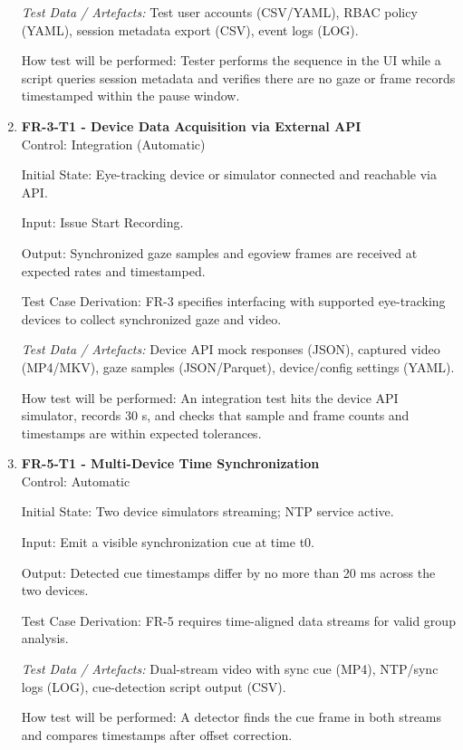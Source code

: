 \documentclass[12pt, titlepage]{article}
\begin{document}
\begin{enumerate}
\textit{Test Data / Artefacts:} Test user accounts (CSV/YAML), RBAC policy (YAML), session metadata export (CSV), event logs (LOG).

How test will be performed: Tester performs the sequence in the UI while a script queries session metadata and verifies there are no gaze or frame records timestamped within the pause window.

\item \textbf{FR-3-T1 - Device Data Acquisition via External API} \\

Control: Integration (Automatic)

Initial State: Eye-tracking device or simulator connected and reachable via API.

Input: Issue Start Recording.

Output: Synchronized gaze samples and egoview frames are received at expected rates and timestamped.

Test Case Derivation: FR-3 specifies interfacing with supported eye-tracking devices to collect synchronized gaze and video.

\textit{Test Data / Artefacts:} Device API mock responses (JSON), captured video (MP4/MKV), gaze samples (JSON/Parquet), device/config settings (YAML).

How test will be performed: An integration test hits the device API simulator, records 30 s, and checks that sample and frame counts and timestamps are within expected tolerances.

\item \textbf{FR-5-T1 - Multi-Device Time Synchronization} \\

Control: Automatic

Initial State: Two device simulators streaming; NTP service active.

Input: Emit a visible synchronization cue at time t0.

Output: Detected cue timestamps differ by no more than 20 ms across the two devices.

Test Case Derivation: FR-5 requires time-aligned data streams for valid group analysis.

\textit{Test Data / Artefacts:} Dual-stream video with sync cue (MP4), NTP/sync logs (LOG), cue-detection script output (CSV).

How test will be performed: A detector finds the cue frame in both streams and compares timestamps after offset correction.


\end{enumerate}
\end{document}

